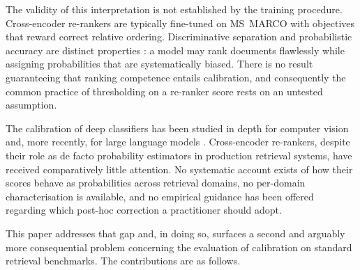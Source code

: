 \documentclass[sn-mathphys-num,pdflatex]{sn-jnl}
\begin{document}
The validity of this interpretation is not established by the training procedure.
Cross-encoder re-rankers are typically fine-tuned on MS~MARCO
\cite{nguyen2016msmarco} with objectives that reward correct relative ordering.
Discriminative separation and probabilistic accuracy are distinct properties
\cite{degroot1983}: a model may rank documents flawlessly while assigning
probabilities that are systematically biased. There is no result guaranteeing
that ranking competence entails calibration, and consequently the common practice
of thresholding on a re-ranker score rests on an untested assumption.

The calibration of deep classifiers has been studied in depth for computer vision
\cite{guo2017,minderer2021} and, more recently, for large language models
\cite{kadavath2022,geng2024survey}. Cross-encoder re-rankers, despite their role
as de facto probability estimators in production retrieval systems, have received
comparatively little attention. No systematic account exists of how their scores
behave as probabilities across retrieval domains, no per-domain characterisation
is available, and no empirical guidance has been offered regarding which post-hoc
correction a practitioner should adopt.

This paper addresses that gap and, in doing so, surfaces a second and arguably
more consequential problem concerning the evaluation of calibration on standard
retrieval benchmarks. The contributions are as follows.
\end{document}
